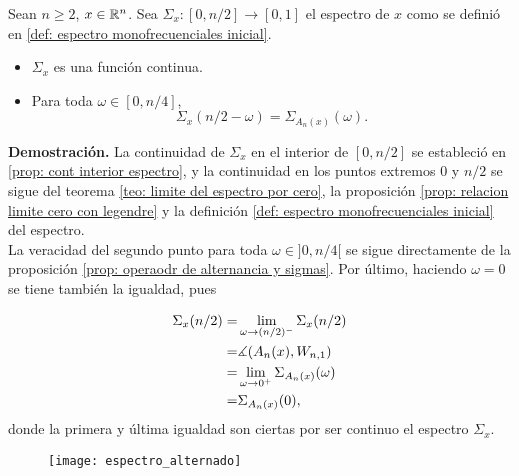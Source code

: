 \begin{prop}
\label{prop: continuidad espctro espacois monof.}
Sean $n \geq 2$, $x \in \mathbb{R}^{n}$.
Sea $\Sigma_{x}:[0, n/2] \rightarrow [0,1]$ el espectro 
de $x$ como se definió en 
\ref{def: espectro monofrecuenciales inicial}.
\begin{itemize}
	\item $\Sigma_{x}$ es una función continua.
	\item Para toda $\omega \in [0, n/4]$,
	\[
	\Sigma_{x}(n/2-\omega) = \Sigma_{A_{n}(x)}(\omega).
	\]
\end{itemize}
\end{prop}
\noindent
\textbf{Demostración.}
La continuidad de $\Sigma_{x}$ en el interior de
$[0, n/2]$ se estableció en
\ref{prop: cont interior espectro}, y la continuidad
en los puntos extremos $0$ y $n/2$
se sigue del
teorema \ref{teo: limite del espectro por cero},
la proposición
\ref{prop: relacion limite cero con legendre}
y la definición \ref{def: espectro monofrecuenciales inicial}
del espectro. \\

La veracidad del segundo punto para toda
$\omega \in ]0, n/4[$ se sigue directamente de 
la proposición 
\ref{prop: operaodr de alternancia y sigmas}. Por último,
haciendo $\omega = 0$ se tiene también la igualdad, pues

\begin{align*}
\Sigma_{x}(n/2) = &
\lim\limits_{\omega \rightarrow (n/2)^{-}}{\Sigma_{x}(n/2)} \\
= & \measuredangle(A_{n}(x), W_{n,1}) \\
= & \lim\limits_{\omega \rightarrow 0^{+}}{ \Sigma_{A_{n}(x)}(\omega)} \\
= & \Sigma_{A_{n}(x)}(0),
\end{align*}
donde la primera y última igualdad son ciertas
por ser continuo el espectro $\Sigma_{x}$.
\QEDB
\vspace{0.2cm}

\begin{figure}[H]
	\centering
	\texttt{[image: espectro\_alternado]} 
\end{figure}	

